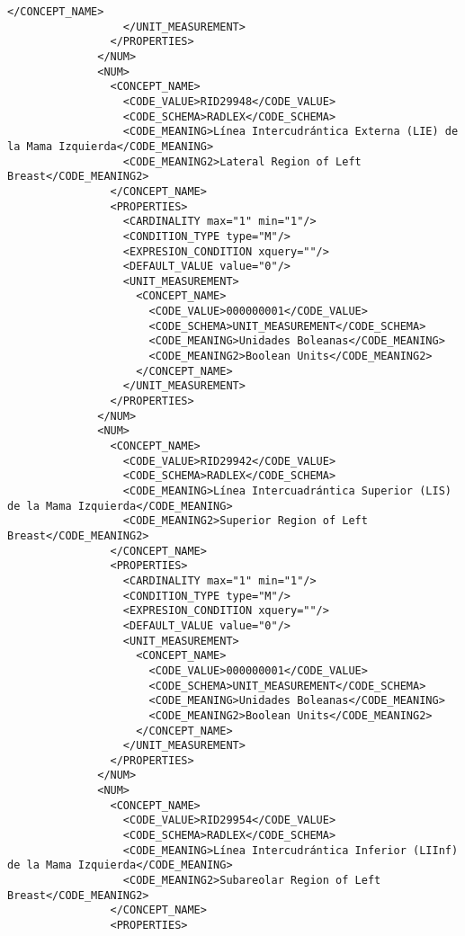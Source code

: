 \begin{lstlisting}[label=some-code,caption=Some Code]
                    </CONCEPT_NAME>
                  </UNIT_MEASUREMENT>
                </PROPERTIES>
              </NUM>
              <NUM>
                <CONCEPT_NAME>
                  <CODE_VALUE>RID29948</CODE_VALUE>
                  <CODE_SCHEMA>RADLEX</CODE_SCHEMA>
                  <CODE_MEANING>Línea Intercudrántica Externa (LIE) de la Mama Izquierda</CODE_MEANING>
                  <CODE_MEANING2>Lateral Region of Left Breast</CODE_MEANING2>
                </CONCEPT_NAME>
                <PROPERTIES>
                  <CARDINALITY max="1" min="1"/>
                  <CONDITION_TYPE type="M"/>
                  <EXPRESION_CONDITION xquery=""/>
                  <DEFAULT_VALUE value="0"/>
                  <UNIT_MEASUREMENT>
                    <CONCEPT_NAME>
                      <CODE_VALUE>000000001</CODE_VALUE>
                      <CODE_SCHEMA>UNIT_MEASUREMENT</CODE_SCHEMA>
                      <CODE_MEANING>Unidades Boleanas</CODE_MEANING>
                      <CODE_MEANING2>Boolean Units</CODE_MEANING2>
                    </CONCEPT_NAME>
                  </UNIT_MEASUREMENT>
                </PROPERTIES>
              </NUM>
              <NUM>
                <CONCEPT_NAME>
                  <CODE_VALUE>RID29942</CODE_VALUE>
                  <CODE_SCHEMA>RADLEX</CODE_SCHEMA>
                  <CODE_MEANING>Línea Intercuadrántica Superior (LIS) de la Mama Izquierda</CODE_MEANING>
                  <CODE_MEANING2>Superior Region of Left Breast</CODE_MEANING2>
                </CONCEPT_NAME>
                <PROPERTIES>
                  <CARDINALITY max="1" min="1"/>
                  <CONDITION_TYPE type="M"/>
                  <EXPRESION_CONDITION xquery=""/>
                  <DEFAULT_VALUE value="0"/>
                  <UNIT_MEASUREMENT>
                    <CONCEPT_NAME>
                      <CODE_VALUE>000000001</CODE_VALUE>
                      <CODE_SCHEMA>UNIT_MEASUREMENT</CODE_SCHEMA>
                      <CODE_MEANING>Unidades Boleanas</CODE_MEANING>
                      <CODE_MEANING2>Boolean Units</CODE_MEANING2>
                    </CONCEPT_NAME>
                  </UNIT_MEASUREMENT>
                </PROPERTIES>
              </NUM>
              <NUM>
                <CONCEPT_NAME>
                  <CODE_VALUE>RID29954</CODE_VALUE>
                  <CODE_SCHEMA>RADLEX</CODE_SCHEMA>
                  <CODE_MEANING>Línea Intercudrántica Inferior (LIInf) de la Mama Izquierda</CODE_MEANING>
                  <CODE_MEANING2>Subareolar Region of Left Breast</CODE_MEANING2>
                </CONCEPT_NAME>
                <PROPERTIES>

\end{lstlisting}
